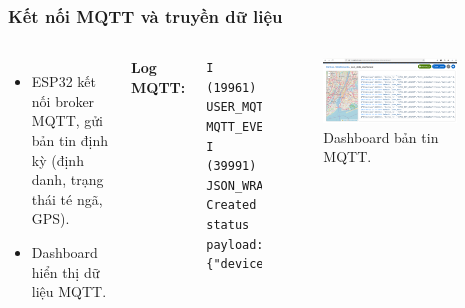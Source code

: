 \begin{frame}[t,fragile]
\frametitle{Kết nối MQTT và truyền dữ liệu}
\begin{columns}[T]
    \begin{itemize}
        \item ESP32 kết nối broker MQTT, gửi bản tin định kỳ (định danh, trạng thái té ngã, GPS).
        \item Dashboard hiển thị dữ liệu MQTT.
    \end{itemize}
    \textbf{Log MQTT:}
    \begin{verbatim}
I (19961) USER_MQTT: MQTT_EVENT_CONNECTED
I (39991) JSON_WRAPPER: Created status payload:
{"device_id":"ESP32_DEV_76E48B","fall_detected":false}
    \end{verbatim}
    \begin{figure}
        \centering
        \includegraphics[width=0.9\textwidth]{images/json_data_dashboard.png}
        \caption{Dashboard bản tin MQTT.}
        \label{fig:mqtt_dashboard}
    \end{figure}
\end{columns}
\end{frame}


